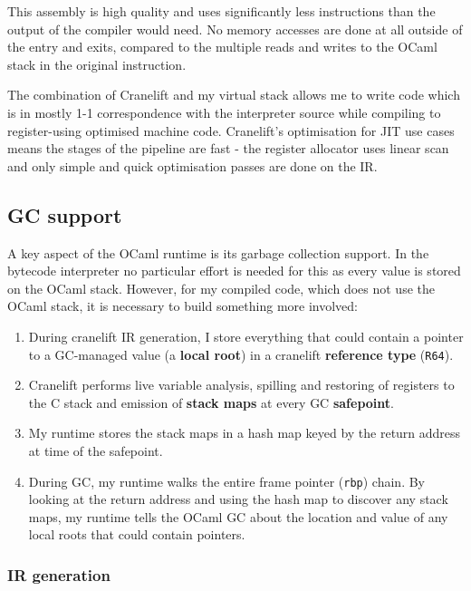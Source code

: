 This assembly is high quality and uses significantly less instructions than the output of the
compiler would need. No memory accesses are done at all outside of the entry and exits, compared to
the multiple reads and writes to the OCaml stack in the original instruction.

The combination of Cranelift and my virtual stack allows me to write code which is in mostly 1-1
correspondence with the interpreter source while compiling to register-using optimised machine
code. Cranelift's optimisation for JIT use cases means the stages of the pipeline are fast - the
register allocator uses linear scan and only simple and quick optimisation passes are done on the
IR.

\subsection{GC support} \label{gc-support}

A key aspect of the OCaml runtime is its garbage collection support. In the bytecode interpreter no
particular effort is needed for this as every value is stored on the OCaml stack. However, for my
compiled code, which does not use the OCaml stack, it is necessary to build something more
involved:

\begin{enumerate}
      \item During cranelift IR generation, I store everything that could contain a pointer to a
            GC-managed value (a \textbf{local root}) in a cranelift \textbf{reference type}
            (\texttt{R64}).
      \item Cranelift performs live variable analysis, spilling and restoring of registers to the C
            stack and emission of \textbf{stack maps} at every GC \textbf{safepoint}.
      \item My runtime stores the stack maps in a hash map keyed by the return address at time of
            the safepoint.
      \item During GC, my runtime walks the entire frame pointer (\texttt{rbp}) chain. By looking
            at the return address and using the hash map to discover any stack maps, my runtime
            tells the OCaml GC about the location and value of any local roots that could contain
            pointers.
\end{enumerate}

\subsubsection{IR generation} \label{gc-ir}

